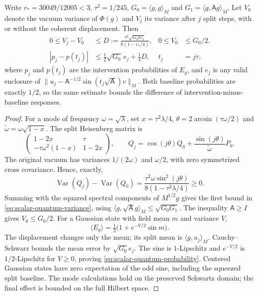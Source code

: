 \begin{proposition}
\label{prop:source-scalar-quantum-probability}
Write $r_*=30049/12005<3$, $\tau^2=1/245$,
$G_0=\langle g,g\rangle_M$ and
$G_1=\langle g,\mathsf A g\rangle_M$.
Let $V_0$ denote the vacuum variance of $\Phi(g)$ and $V_j$ its variance
after $j$ split steps, with or without the coherent displacement. Then
\begin{align}
 0\le V_j-V_0&\le
 D:=\frac{\tau^2\sqrt{G_0G_1}}{8(1-r_*/4)},
 &0\le V_0&\le G_0/2.\label{eq:scalar-quantum-variance}\\
 |p_j-p(t_j)|&\le \tfrac12\sqrt{G_0}\,e_j+\tfrac14D,
 &t_j&=j\tau,\label{eq:scalar-quantum-probability}
\end{align}
where $p_j$ and $p(t_j)$ are the intervention probabilities of $E_g$,
and $e_j$ is any valid enclosure of
$\|u_j-\mathsf A^{-1/2}\sin(t_j\sqrt{\mathsf A})v\|_M$.
Both baseline probabilities are exactly $1/2$, so the same estimate
bounds the difference of intervention-minus-baseline responses.
\end{proposition}
\begin{proof}
For a mode of frequency $\omega=\sqrt\lambda$, set
$x=\tau^2\lambda/4$, $\theta=2\arcsin(\tau\omega/2)$ and
$\widetilde\omega=\omega\sqrt{1-x}$. The split Heisenberg matrix is
\[
 \begin{pmatrix}1-2x&\tau\\-\tau\omega^2(1-x)&1-2x\end{pmatrix},
 \qquad
 Q_j=\cos(j\theta)Q_0+
       \frac{\sin(j\theta)}{\widetilde\omega}P_0.
\]
The original vacuum has variances $1/(2\omega)$ and $\omega/2$, with
zero symmetrized cross covariance. Hence, exactly,
\[
 \operatorname{Var}(Q_j)-\operatorname{Var}(Q_0)
 =\frac{\tau^2\omega\sin^2(j\theta)}{8(1-\tau^2\lambda/4)}\ge0.
\]
Summing with the squared spectral components of $M^{1/2}g$ gives the
first bound in \eqref{eq:scalar-quantum-variance}, using
$\langle g,\sqrt{\mathsf A}g\rangle_M\le\sqrt{G_0G_1}$.
The inequality $\mathsf A\ge I$ gives $V_0\le G_0/2$.
For a Gaussian state with field mean $m$ and variance $V$,
\[
 \langle E_g\rangle=\tfrac12\bigl(1+e^{-V/2}\sin m\bigr).
\]
The displacement changes only the mean; its split mean is
$\langle g,u_j\rangle_M$.
Cauchy--Schwarz bounds the mean error by $\sqrt{G_0}e_j$.
The sine is $1$-Lipschitz and $e^{-V/2}$ is $1/2$-Lipschitz for
$V\ge0$, proving \eqref{eq:scalar-quantum-probability}.
Centered Gaussian states have zero expectation of the odd sine,
including the squeezed split baseline.
The mode calculations hold on the preserved Schwartz domain;
the final effect is bounded on the full Hilbert space.
\end{proof}

